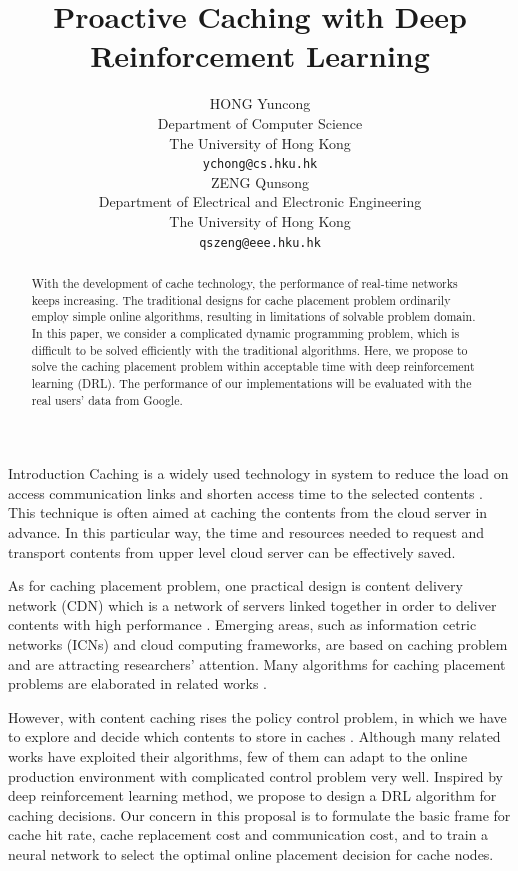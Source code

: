 \documentclass{article}
\title{Proactive Caching with Deep Reinforcement Learning}
\author{
  HONG Yuncong \\
  Department of Computer Science \\
  The University of Hong Kong \\
  \texttt{ychong@cs.hku.hk} \\
  \And %
  ZENG Qunsong \\
  Department of Electrical and Electronic Engineering \\
  The University of Hong Kong \\
  \texttt{qszeng@eee.hku.hk} \\
}
\begin{document}
\maketitle

\begin{abstract}
  With the development of cache technology, the performance of real-time networks keeps increasing. The traditional designs for cache placement problem ordinarily employ simple online algorithms, resulting in limitations of solvable problem domain. In this paper, we consider a complicated dynamic programming problem, which is difficult to be solved efficiently with the traditional algorithms. Here, we propose to solve the caching placement problem within acceptable time with deep reinforcement learning (DRL). The performance of our implementations will be evaluated with the real users' data from Google.
\end{abstract}

\begin{section}{Introduction}
    \label{intro}
    Caching is a widely used technology in system to reduce the load on access communication links and shorten access time to the selected contents \cite{general-cache}. This technique is often aimed at caching the contents from the cloud server in advance. In this particular way, the time and resources needed to request and transport contents from upper level cloud server can be effectively saved.
    
    As for caching placement problem, one practical design is content delivery network (CDN) which is a network of servers linked together in order to deliver contents with high performance \cite{cloudflare}. Emerging areas, such as information cetric networks (ICNs) and cloud computing frameworks, \cite{ref1,ref2,ref3,ref4} are based on caching problem and are attracting researchers' attention. Many algorithms for caching placement problems are elaborated in related works \cite{dl-mec,dl-icn,expert-cdn}.
    
    However, with content caching rises the policy control problem, in which we have to explore and decide which contents to store in caches \cite{DBLP:journals/corr/abs-1712-08132}. Although many related works have exploited their algorithms, few of them can adapt to the online production environment with complicated control problem very well. Inspired by deep reinforcement learning method, we propose to design a DRL algorithm for caching decisions. Our concern in this proposal is to formulate the basic frame for cache hit rate, cache replacement cost and communication cost, and to train a neural network to select the optimal online placement decision for cache nodes.
\end{section}
\end{document}
